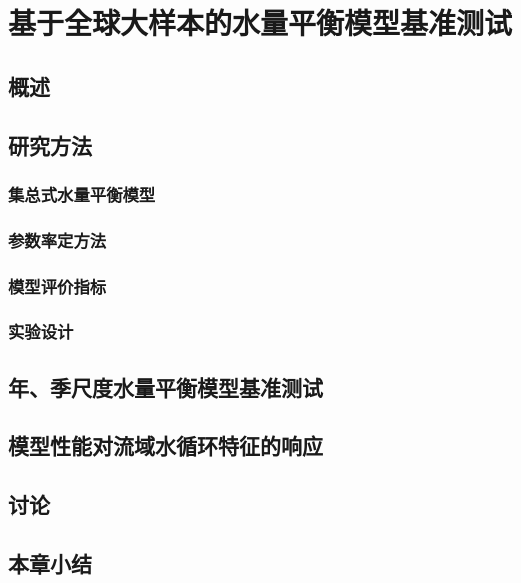 \chapter{基于全球大样本的水量平衡模型基准测试}
\label{chap:model_compare}

\section{概述}

\section{研究方法}

\subsection{集总式水量平衡模型}

\subsection{参数率定方法}

\subsection{模型评价指标}

\subsection{实验设计}

\section{年、季尺度水量平衡模型基准测试}

\section{模型性能对流域水循环特征的响应}

\section{讨论}

\section{本章小结}

\clearpage